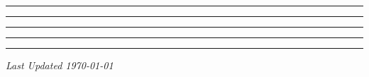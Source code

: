 \documentclass[10pt,landscape,a4paper]{article}
\begin{document}
\small
\begin{multicols*}{4}
	
\setcounter{section}{0}
 \hrule
 \hrule
 \hrule
 \hrule
 \hrule


\begin{center}
	\emph{Last Updated \today}
\end{center}

\end{multicols*}
\end{document}
